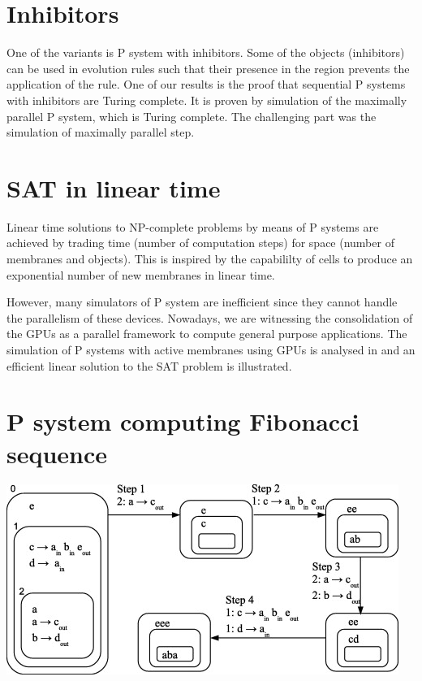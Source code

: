 \documentclass[myposter,portrait]{sciposter}
\def\mysection#1{
{\color{sectionCol}\section*{\sc\bfseries #1}}}
\begin{document}
\begin{multicols*}{3}
\mysection{Inhibitors}

One of the variants is P system with inhibitors. Some of the objects (inhibitors) can be used in evolution rules such that their presence in the region prevents the application of the rule. One of our results is the proof that sequential P systems with inhibitors are Turing complete. It is proven by simulation of the maximally parallel P system, which is Turing complete. The challenging part was the simulation of maximally parallel step.


\mysection{SAT in linear time}

Linear time solutions to NP-complete problems by means of P systems are achieved by trading time (number of computation steps) for space (number of membranes and objects). This is inspired by the capabililty of cells to produce an exponential number of new membranes in linear time.

However, many simulators of P system are inefficient since they cannot handle the parallelism of these devices. Nowadays, we are witnessing the consolidation of the GPUs as a parallel framework to compute general purpose applications. The simulation of P systems with active membranes using GPUs is analysed in \cite{Cecilia10} and an efficient linear solution to the SAT problem is illustrated.

\mysection{P system computing Fibonacci sequence}

\vspace{10mm}
\includegraphics[width=\columnwidth]{p_system_fibonacci}
\vspace{10mm}





\end{multicols*}
\end{document}
